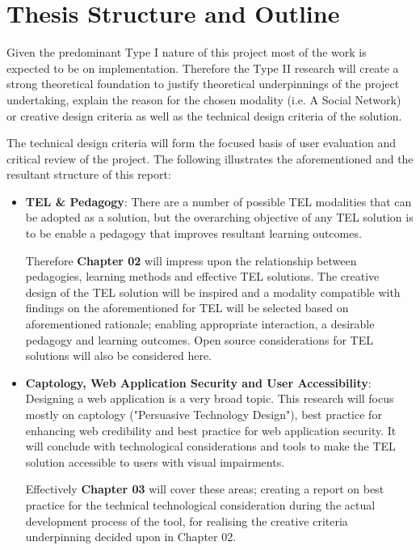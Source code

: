 








\section{Thesis Structure and Outline}
\label{sec1:sec04}

Given the predominant Type I nature of this project most of the work is expected to be on implementation. Therefore the Type II research will create a strong theoretical foundation to justify theoretical underpinnings of the project undertaking, explain the reason for the chosen modality (i.e. A Social Network) or creative design criteria as well as the technical design criteria of the solution.

The technical design criteria will form the focused basis of user evaluation and critical review of the project. The following illustrates the aforementioned and the resultant structure of this report:

\begin{itemize}

\item\textbf{TEL \& Pedagogy}: There are a number of possible TEL modalities that can be adopted as a solution, but the  overarching objective of any TEL solution is to be enable a pedagogy that improves resultant learning outcomes.

Therefore \textbf{Chapter 02} will impress upon the relationship between pedagogies, learning methods and effective TEL solutions. The creative design of the TEL solution will be inspired and a modality compatible with findings on the aforementioned for TEL will be selected based on aforementioned rationale; enabling appropriate interaction, a desirable pedagogy and learning outcomes. Open source considerations for TEL solutions will also be considered here.


\item\textbf {Captology, Web Application Security and User Accessibility}: Designing a web application is a very broad topic. This research will focus mostly on captology ("Persuasive Technology Design"), best practice for enhancing web credibility and best practice for web application security. It will conclude with technological considerations and tools to make the TEL solution accessible to users with visual impairments. 

Effectively \textbf{Chapter 03} will cover these areas; creating  a report on best practice for the technical technological consideration during the actual development process of the tool, for realising the creative criteria underpinning decided upon in Chapter 02.

\end{itemize}

